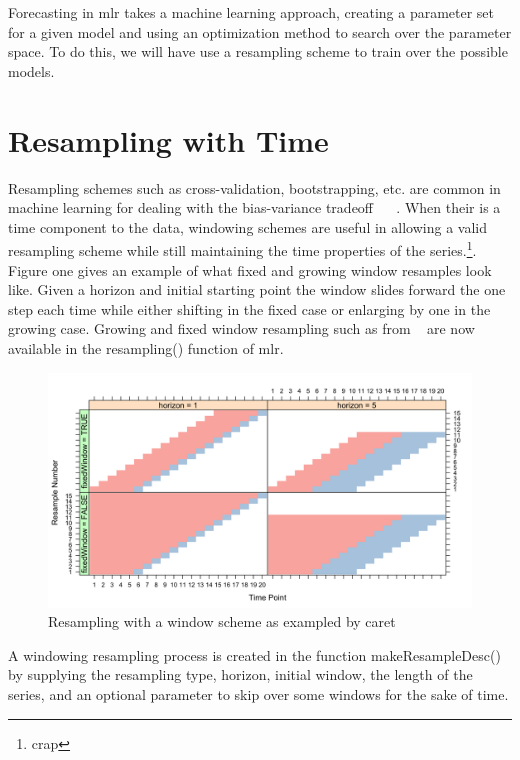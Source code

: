 \documentclass{article}\usepackage[]{graphicx}\usepackage[]{color}
\makeatletter
\theoremstyle{definition}
\newcommand\code{\@codex}
\def\@codex#1{{\normalfont\ttfamily\hyphenchar\font=-1 #1}}
\newcommand{\pkg}[1]{{\fontseries{b}\selectfont #1}}
\makeatother
\begin{document}
Forecasting in \pkg{mlr} takes a machine learning approach, creating a parameter set for a given model and using an optimization method to search over the parameter space. To do this, we will have use a resampling scheme to train over the possible models.

\section{Resampling with Time}

Resampling schemes such as cross-validation, bootstrapping, etc. are common in machine learning for dealing with the bias-variance tradeoff ~\cite{Friedman1997} ~\cite{rodriguezkfold}. When their is a time component to the data, windowing schemes are useful in allowing a valid resampling scheme while still maintaining the time properties of the series.\footnote{crap}. Figure one gives an example of what fixed and growing window resamples look like. Given a horizon and initial starting point the window slides forward the one step each time while either shifting in the fixed case or enlarging by one in the growing case. Growing and fixed window resampling such as from ~\cite{hyndman2014forecasting} are now available in the \code{resampling()} function of \pkg{mlr}. 

\begin{figure}[ht]
\caption{Resampling with a window scheme as exampled by caret ~\cite{windowingcaret} }
  \includegraphics[scale = .2]{windowing_pic_caret}
  \centering
\end{figure}
\newpage

A windowing resampling process is created in the function \code{makeResampleDesc()} by supplying the resampling type, horizon, initial window, the length of the series, and an optional parameter to skip over some windows for the sake of time.
\end{document}
